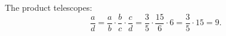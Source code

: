 The product telescopes:
\[
\dfrac {a}{d}=\dfrac {a}{b}\cdot\dfrac {b}{c}\cdot\dfrac {c}{d}=\dfrac{3}{5}\cdot\dfrac{15}{6}\cdot6=\dfrac{3}{5}\cdot15=\boxed{9}.
\]
